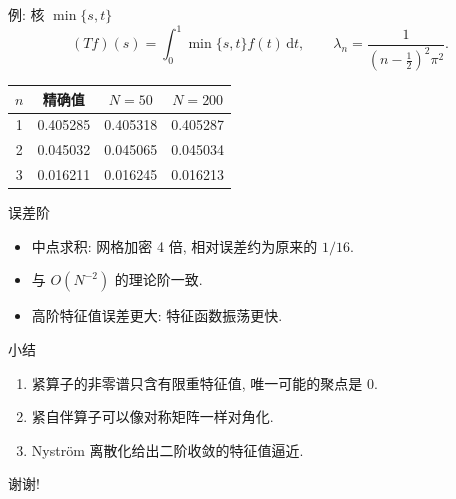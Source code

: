 \documentclass[aspectratio=169]{ctexbeamer}
\begin{document}
\begin{frame}{例: 核 $\min\{s,t\}$}
  \begin{equation*}
    (Tf)(s)=\int_0^1\min\{s,t\}f(t)\,\mathrm{d}t,\qquad
    \lambda_n=\frac{1}{(n-\frac12)^2\pi^2}.
  \end{equation*}
  \centering
  \begin{tabular}{cccc}
    \toprule
    $n$ & 精确值 & $N=50$ & $N=200$ \\
    \midrule
    1 & 0.405285 & 0.405318 & 0.405287 \\
    2 & 0.045032 & 0.045065 & 0.045034 \\
    3 & 0.016211 & 0.016245 & 0.016213 \\
    \bottomrule
  \end{tabular}
\end{frame}

\begin{frame}{误差阶}
  \begin{itemize}
    \item 中点求积: 网格加密 4 倍, 相对误差约为原来的 $1/16$.
    \item 与 $O(N^{-2})$ 的理论阶一致.
    \item 高阶特征值误差更大: 特征函数振荡更快.
  \end{itemize}
\end{frame}

\begin{frame}{小结}
  \begin{enumerate}
    \item 紧算子的非零谱只含有限重特征值, 唯一可能的聚点是 $0$.
    \item 紧自伴算子可以像对称矩阵一样对角化.
    \item Nyström 离散化给出二阶收敛的特征值逼近.
  \end{enumerate}
  \bigskip
  \centering\Large 谢谢!
\end{frame}
\end{document}
